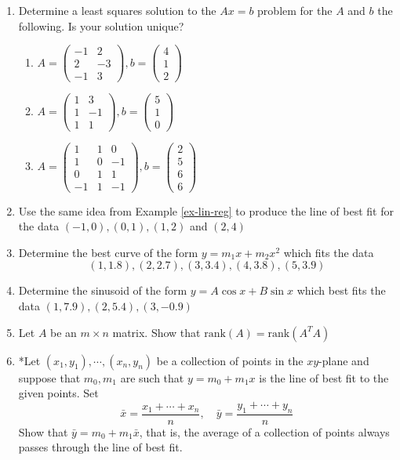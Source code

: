\documentclass[12pt]{article}
\numberwithin{equation}{subsection}
\numberwithin{figure}{subsection}
\theoremstyle{note}
\newcommand\rank[1]{\mathrm{rank}(#1)}
\newcommand\m[1]{\begin{pmatrix}#1\end{pmatrix}}
\begin{document}
\begin{enumerate}[label=\arabic*.]
\item Determine a least squares solution to the $Ax=b$ problem for the $A$ and $b$ the following. Is your solution unique?
\begin{enumerate}
	\item $A=\m{-1 & 2\\ 2 & -3 \\ -1 & 3}, b=\m{4\\1\\2}$
	\item $A=\m{1 & 3 \\ 1 & -1 \\ 1& 1}, b=\m{5\\1\\0}$
	\item $A=\m{1 & 1 & 0 \\1 & 0 & -1 \\ 0 & 1 & 1 \\ -1 & 1 & -1}, b=\m{2 \\ 5\\ 6\\6 }$
\end{enumerate}

\item Use the same idea from Example \ref{ex-lin-reg} to produce the line of best fit for the data $(-1,0),(0,1),(1,2)$ and $(2,4)$

\item Determine the best curve of the form $y=m_1x+m_2x^2$ which fits the data \[(1,1.8),(2, 2.7), (3,3.4), (4, 3.8), (5, 3.9)\]

\item Determine the sinusoid of the form $y=A\cos x+B \sin x $ which best fits the data $(1, 7.9), (2, 5.4), (3, -0.9)$

\item Let $A$ be an $m\times n$ matrix. Show that $\rank{A}=\rank{A^TA}$

\item *Let $(x_1,y_1), \cdots, (x_n,y_n)$ be a collection of points in the $xy$-plane and suppose that $m_0,m_1$ are such that $y=m_0+m_1x$ is the line of best fit to the given points. Set \[ \bar{x}=\dfrac{x_1+\cdots+x_n}{n}, \quad \bar{y}=\dfrac{y_1+\cdots+y_n}{n}\] Show that $\bar{y}=m_0+m_1 \bar{x}$, that is, the average of a collection of points always passes through the line of best fit. 


\end{enumerate}
\end{document}
